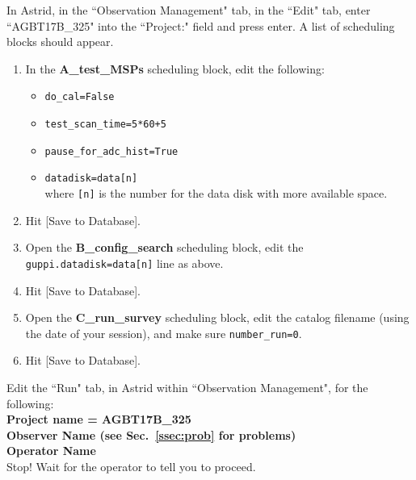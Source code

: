 \documentclass[11pt]{article}
\begin{document}
\noindent In Astrid, in the ``Observation Management" tab, in the ``Edit" tab, enter ``AGBT17B\_325" into the ``Project:" field and press enter. A list of scheduling blocks should appear. 
\begin{enumerate}
 \item In the \textbf{A\_test\_MSPs} scheduling block, edit the following: 

 \begin{itemize}
  \item \texttt{do\_cal=False}
  \item \texttt{test\_scan\_time=5*60+5}
  \item \texttt{pause\_for\_adc\_hist=True} 
  \item \texttt{datadisk=data[n]} \\
  where \texttt{[n]} is the number for the data disk with more available space. 
 \end{itemize}

 \item Hit [Save to Database].
 \item Open the \textbf{B\_config\_search} scheduling block, edit the \texttt{guppi.datadisk=data[n]} line as above. 
 \item Hit [Save to Database].
 \item Open the \textbf{C\_run\_survey} scheduling block, edit the catalog filename (using the date of your session), and make sure \texttt{number\_run=0}. 
 \item Hit [Save to Database].
\end{enumerate}

\noindent Edit the ``Run" tab, in Astrid within ``Observation Management", for the following: \\
\indent\textbf{Project name = AGBT17B\_325 \\
\indent Observer Name (see Sec.~\ref{ssec:prob} for problems)\\
\indent Operator Name} \\
Stop! Wait for the operator to tell you to proceed.


\end{document}
